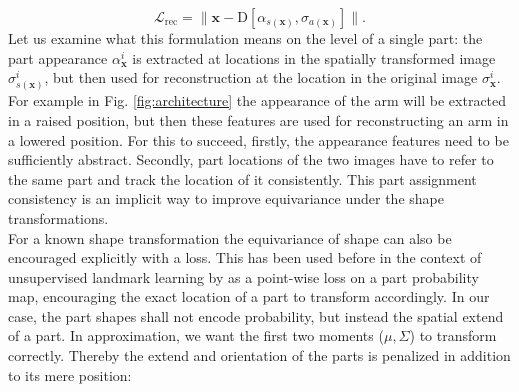 	\begin{equation}\label{eq:loss_rec}
		\mathcal{L}_{\textrm{rec}}= \lVert  \mathbf{x}  - \mathrm{D}[{\alpha}_{s(\mathbf{x})}, {\sigma}_{a(\mathbf{x})}]\rVert.
	\end{equation}
	Let us examine what this formulation means on the level of a single part: the part appearance $\alpha^i_{\mathbf{x}}$ is extracted at locations in the spatially transformed image ${\sigma}^i_{s(\mathbf{x})}$, but then used for reconstruction at the location in the original image ${\sigma}^i_{\mathbf{x}}$. For example in Fig.  \ref{fig:architecture} the appearance of the arm will be extracted in a raised position, but then these features are used for reconstructing an arm in a lowered position. For this to succeed, firstly, the appearance features need to be sufficiently abstract. Secondly, part locations of the two images have to refer to the same part and track the location of it consistently. This part assignment consistency is an implicit way to improve equivariance under the shape transformations.\\
	For a known shape transformation the equivariance of shape can also be encouraged explicitly with a loss. This has been used before in the context of unsupervised landmark learning by \cite{thewlis17, zhang18} as a point-wise loss on a part probability map, encouraging the exact location of a part to transform accordingly. In our case, the part shapes shall not encode probability, but instead the spatial extend of a part. In approximation, we want the first two moments ($\mu, \Sigma$) to transform correctly. Thereby the extend and orientation of the parts is penalized in addition to its mere position:
